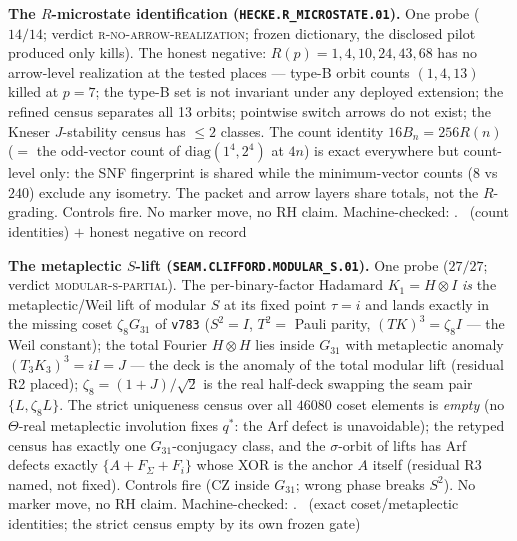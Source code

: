 \documentclass[11pt,a4paper]{article}
\theoremstyle{definition}
\begin{document}
\par\smallskip\noindent\textbf{The $R$-microstate identification
(\texttt{HECKE.R\_MICROSTATE.01}).}
One probe ($14/14$; verdict \textsc{r-no-arrow-realization};
frozen dictionary, the disclosed pilot produced only kills).  The
honest negative: $R(p)=1,4,10,24,43,68$ has no arrow-level
realization at the tested places --- type-B orbit counts $(1,4,13)$
killed at $p=7$; the type-B set is not invariant under any deployed
extension; the refined census separates all 13 orbits; pointwise
switch arrows do not exist; the Kneser $J$-stability census has
$\le2$ classes.  The count identity $16B_n=256R(n)$ ($=$ the
odd-vector count of $\mathrm{diag}(1^4,2^4)$ at $4n$) is exact
everywhere but count-level only: the SNF fingerprint is shared while
the minimum-vector counts ($8$ vs $240$) exclude any isometry.  The
packet and arrow layers share totals, not the $R$-grading.  Controls
fire.  No marker move, no RH claim.
Machine-checked: .
\mE\ (count identities) $+$ honest negative on record
\par\smallskip

\par\smallskip\noindent\textbf{The metaplectic $S$-lift
(\texttt{SEAM.CLIFFORD.MODULAR\_S.01}).}
One probe ($27/27$; verdict \textsc{modular-s-partial}).  The
per-binary-factor Hadamard $K_1=H\otimes I$ \emph{is} the
metaplectic/Weil lift of modular $S$ at its fixed point $\tau=i$ and
lands exactly in the missing coset $\zeta_8G_{31}$ of \texttt{v783}
($S^2=I$, $T^2=$ Pauli parity, $(TK)^3=\zeta_8 I$ --- the Weil
constant); the total Fourier $H\otimes H$ lies inside $G_{31}$ with
metaplectic anomaly $(T_3K_3)^3=iI=J$ --- the deck is the anomaly of
the total modular lift (residual R2 placed); $\zeta_8=(1{+}J)/\sqrt2$
is the real half-deck swapping the seam pair $\{L,\zeta_8L\}$.  The
strict uniqueness census over all $46080$ coset elements is
\emph{empty} (no $\Theta$-real metaplectic involution fixes
$q^{*}$: the Arf defect is unavoidable); the retyped census has
exactly one $G_{31}$-conjugacy class, and the $\sigma$-orbit of
lifts has Arf defects exactly $\{A+F_{\Sigma}+F_i\}$ whose XOR is
the anchor $A$ itself (residual R3 named, not fixed).  Controls fire
(CZ inside $G_{31}$; wrong phase breaks $S^2$).  No marker move, no
RH claim.
Machine-checked: .
\mE\ (exact coset/metaplectic identities; the strict census empty by
its own frozen gate)
\par\smallskip
\end{document}
